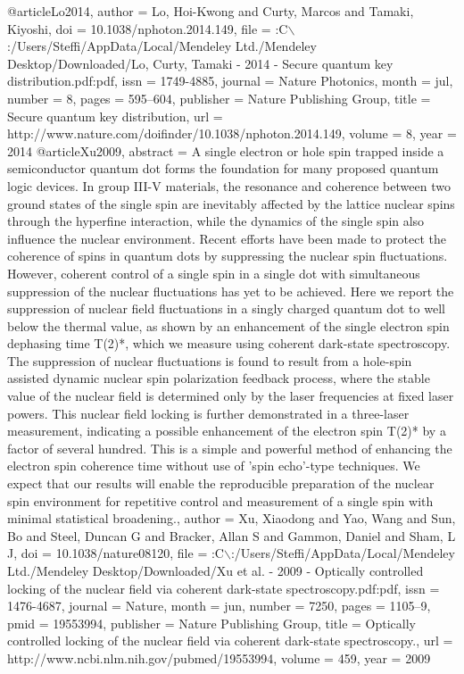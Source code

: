 @article{Lo2014,
author = {Lo, Hoi-Kwong and Curty, Marcos and Tamaki, Kiyoshi},
doi = {10.1038/nphoton.2014.149},
file = {:C$\backslash$:/Users/Steffi/AppData/Local/Mendeley Ltd./Mendeley Desktop/Downloaded/Lo, Curty, Tamaki - 2014 - Secure quantum key distribution.pdf:pdf},
issn = {1749-4885},
journal = {Nature Photonics},
month = {jul},
number = {8},
pages = {595--604},
publisher = {Nature Publishing Group},
title = {{Secure quantum key distribution}},
url = {http://www.nature.com/doifinder/10.1038/nphoton.2014.149},
volume = {8},
year = {2014}
}
@article{Xu2009,
abstract = {A single electron or hole spin trapped inside a semiconductor quantum dot forms the foundation for many proposed quantum logic devices. In group III-V materials, the resonance and coherence between two ground states of the single spin are inevitably affected by the lattice nuclear spins through the hyperfine interaction, while the dynamics of the single spin also influence the nuclear environment. Recent efforts have been made to protect the coherence of spins in quantum dots by suppressing the nuclear spin fluctuations. However, coherent control of a single spin in a single dot with simultaneous suppression of the nuclear fluctuations has yet to be achieved. Here we report the suppression of nuclear field fluctuations in a singly charged quantum dot to well below the thermal value, as shown by an enhancement of the single electron spin dephasing time T(2)*, which we measure using coherent dark-state spectroscopy. The suppression of nuclear fluctuations is found to result from a hole-spin assisted dynamic nuclear spin polarization feedback process, where the stable value of the nuclear field is determined only by the laser frequencies at fixed laser powers. This nuclear field locking is further demonstrated in a three-laser measurement, indicating a possible enhancement of the electron spin T(2)* by a factor of several hundred. This is a simple and powerful method of enhancing the electron spin coherence time without use of 'spin echo'-type techniques. We expect that our results will enable the reproducible preparation of the nuclear spin environment for repetitive control and measurement of a single spin with minimal statistical broadening.},
author = {Xu, Xiaodong and Yao, Wang and Sun, Bo and Steel, Duncan G and Bracker, Allan S and Gammon, Daniel and Sham, L J},
doi = {10.1038/nature08120},
file = {:C$\backslash$:/Users/Steffi/AppData/Local/Mendeley Ltd./Mendeley Desktop/Downloaded/Xu et al. - 2009 - Optically controlled locking of the nuclear field via coherent dark-state spectroscopy.pdf:pdf},
issn = {1476-4687},
journal = {Nature},
month = {jun},
number = {7250},
pages = {1105--9},
pmid = {19553994},
publisher = {Nature Publishing Group},
title = {{Optically controlled locking of the nuclear field via coherent dark-state spectroscopy.}},
url = {http://www.ncbi.nlm.nih.gov/pubmed/19553994},
volume = {459},
year = {2009}
}
